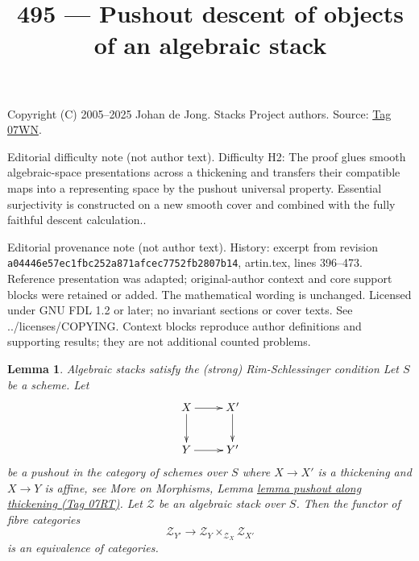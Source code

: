 \documentclass{amsart}
\newenvironment{slogan}{\comment}{\endcomment}
\theoremstyle{plain}
\newtheorem{lemma}[subsection]{Lemma}
\theoremstyle{definition}
\theoremstyle{remark}
\numberwithin{equation}{subsection}
\begin{document}
\title[Stacks Project, Tag 07WN]{495 --- Pushout descent of objects of an algebraic stack}
\maketitle
\noindent Copyright (C) 2005--2025 Johan de Jong. Stacks Project authors. Source: \href{https://stacks.math.columbia.edu/tag/07WN}{Tag 07WN}.

\noindent Editorial difficulty note (not author text). Difficulty H2: The proof glues smooth algebraic-space presentations across a thickening and transfers their compatible maps into a representing space by the pushout universal property. Essential surjectivity is constructed on a new smooth cover and combined with the fully faithful descent calculation..

\noindent Editorial provenance note (not author text). History: excerpt from revision \texttt{a0444\allowbreak 6e57e\allowbreak c1fbc\allowbreak 252a8\allowbreak 71afc\allowbreak ec775\allowbreak 2fb28\allowbreak 07b14}, artin.tex, lines 396--473. Reference presentation was adapted; original-author context and core support blocks were retained or added. The mathematical wording is unchanged. Licensed under GNU FDL 1.2 or later; no invariant sections or cover texts. See ../licenses/COPYING. Context blocks reproduce author definitions and supporting results; they are not additional counted problems.

\begin{lemma}
\label{lemma-pushout}
\begin{slogan}
Algebraic stacks satisfy the (strong) Rim-Schlessinger condition
\end{slogan}
Let $S$ be a scheme. Let
$$
\xymatrix{
X \ar[r] \ar[d] & X' \ar[d] \\
Y \ar[r] & Y'
}
$$
be a pushout in the category of schemes over $S$ where $X \to X'$
is a thickening and $X \to Y$ is affine, see
More on Morphisms, Lemma \href{https://stacks.math.columbia.edu/tag/07RT}{lemma pushout along thickening (Tag 07RT)}.
Let $\mathcal{Z}$ be an algebraic stack over $S$.
Then the functor of fibre categories
$$
\mathcal{Z}_{Y'}
\longrightarrow
\mathcal{Z}_Y \times_{\mathcal{Z}_X} \mathcal{Z}_{X'}
$$
is an equivalence of categories.
\end{lemma}
\end{document}
